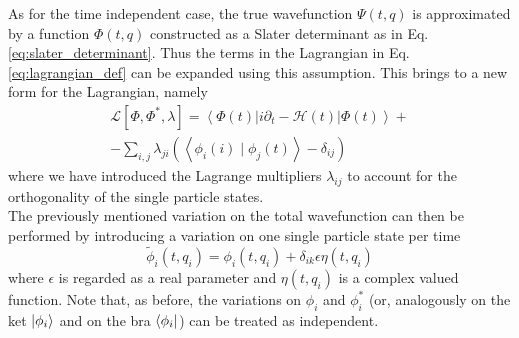 As for the time independent case, the true wavefunction $\Psi(t, q)$ is approximated by a function $\Phi(t, q)$ constructed as a Slater determinant as in Eq.\,\ref{eq:slater_determinant}. Thus the terms in the Lagrangian in Eq.\,\ref{eq:lagrangian_def} can be expanded using this assumption. This brings to a new form for the Lagrangian, namely
\begin{equation*}
\begin{gathered}
    \mathcal{L}[\Phi, \Phi^*, \lambda] = \left\langle\Phi(t)\left| i \partial_{t}-\mathcal{H}(t)\right| \Phi(t)\right\rangle + \\ - \sum_{i,j} \lambda_{ji}\left(\left\langle\phi_{i}(i) \mid \phi_{j} (t) \right\rangle-\delta_{ij}\right)
\end{gathered}
\end{equation*}
where we have introduced the Lagrange multipliers $\lambda_{ij}$ to account for the orthogonality of the single particle states. \\
The previously mentioned variation on the total wavefunction can then be performed by introducing a variation on one single particle state per time
\begin{equation*}
    \widetilde \phi_i(t, q_i) = \phi_i(t, q_i) + \delta_{ik} \epsilon \eta(t, q_i) 
\end{equation*}
where $\epsilon$ is regarded as a real parameter and $\eta(t, q_i)$ is a complex valued function. Note that, as before, the variations on $\phi_i$ and $\phi_i^*$ (or, analogously on the ket $\ket{\phi_i}$ and on the bra $\bra{\phi_i}$) can be treated as independent. \\

